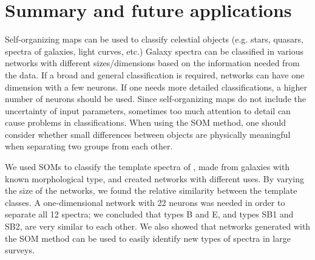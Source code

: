 \section{Summary and future applications}
\label{sec: summary}

Self-organizing maps can be used to classify celestial objects (e.g. stars, quasars, spectra of galaxies, light curves, etc.)
Galaxy spectra can be classified in various networks with different sizes/dimensions based on the information needed from the data. 
If a broad and general classification is required, networks can have one dimension with a few neurons.
If one needs more detailed classifications, a higher number of neurons should be used.
Since self-organizing maps do not include the uncertainty of input parameters, sometimes too much attention to detail can cause problems in classifications. 
When using the SOM method, one should consider whether small differences between objects are physically meaningful when separating two groups from each other.

We used SOMs to classify the template spectra of , made from galaxies with known morphological type, and created networks with different uses.
By varying the size of the networks, we found the relative similarity between the  template classes.
A one-dimensional network with 22 neurons was needed in order to
separate all 12  spectra; we concluded that  types B and E, and types SB1 and SB2, are very similar to each other.
We also showed that networks generated with the SOM method can be used to easily identify new types of spectra in large surveys.

